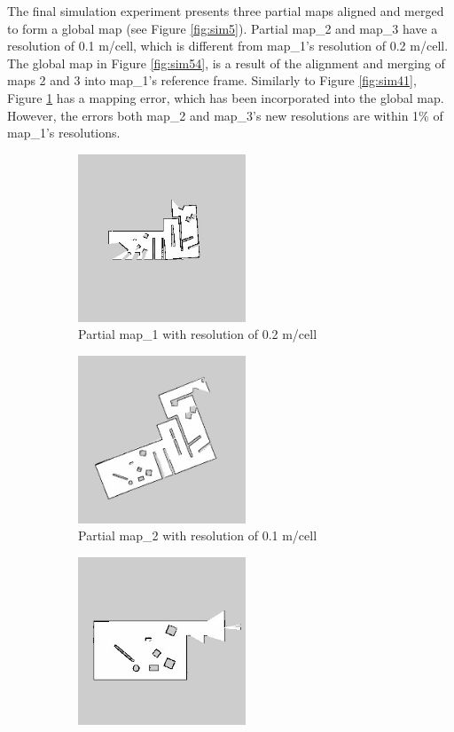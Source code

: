 The final simulation experiment presents three partial maps aligned and merged to form a global map (see Figure \ref{fig:sim5}). Partial map\_2 and map\_3 have a resolution of 0.1 m/cell, which is different from map\_1's resolution of 0.2 m/cell. The global map in Figure \ref{fig:sim54}, is a result of the alignment and merging of maps 2 and 3 into map\_1's reference frame. Similarly to Figure \ref{fig:sim41}, Figure \ref{fig:sim51} has a mapping error, which has been incorporated into the global map. However, the errors both map\_2 and map\_3's new resolutions are within 1\% of map\_1's resolutions. 


\begin{figure}[H]
\begin{subfigure}{0.5\textwidth}
\includegraphics[width=0.9\linewidth, height=5cm]{figs/simulation_results/d_diff_resolution/partial_map_1.jpg} 
\caption{Partial map\_1 with resolution of 0.2 m/cell}
\label{fig:sim51}
\end{subfigure}
\begin{subfigure}{0.5\textwidth}
\includegraphics[width=0.9\linewidth, height=5cm]{figs/simulation_results/d_diff_resolution/partial_map_2.jpg} 
\caption{Partial map\_2 with resolution of 0.1 m/cell}
\label{fig:sim52}
\end{subfigure}
\begin{subfigure}{0.5\textwidth}
\includegraphics[width=0.9\linewidth, height=5cm]{figs/simulation_results/d_diff_resolution/partial_map_3.jpg} 

\end{subfigure}
\end{figure}
